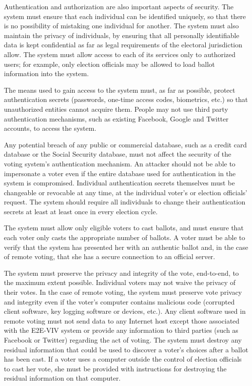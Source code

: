 Authentication and authorization are also important aspects of
security. The system must ensure that each individual can be
identified uniquely, so that there is no possibility of mistaking one
individual for another. The system must also maintain the privacy of
individuals, by ensuring that all personally identifiable data is kept
confidential as far as legal requirements of the electoral
jurisdiction allow. The system must allow access to each of its
services only to authorized users; for example, only election
officials may be allowed to load ballot information into the system.

The means used to gain access to the system must, as far as possible,
protect authentication secrets (passwords, one-time access codes,
biometrics, etc.) so that unauthorized entities cannot acquire
them. People may not use third party authentication mechanisms, such
as existing Facebook, Google and Twitter accounts, to access the
system. 

Any potential breach of any public or commercial database, such as a
credit card database or the Social Security database, must not affect
the security of the voting system's authentication mechanism. An
attacker should not be able to impersonate a voter even if the entire
database used for authentication in the system is
compromised. Individual authentication secrets themselves must be
changeable or revocable at any time, at the individual voter's or
election officials' request. The system should require all individuals
to change their authentication secrets at least at least once in every
election cycle.

The system must allow only eligible voters to cast ballots, and must
ensure that each voter only casts the appropriate number of ballots. A
voter must be able to verify that the system has presented her with an
authentic ballot and, in the case of remote voting, that she has a
secure connection to an official server.

The system must preserve the privacy and integrity of the vote,
end-to-end, to the maximum extent possible. Individual voters may not
waive the privacy of their votes. In the case of remote voting, the
system must preserve vote privacy and integrity even if the voter's
computer contains malicious code (corrupted client software, key
logging software or devices, etc.). Any client software used in remote
voting must not send data to any Internet host except those associated
with the E2E-VIV system or provide any information to third parties
(such as Facebook or Twitter) regarding the act of voting. The system
must destroy any residual information that could be used to discover a
voter's choices after a ballot has been cast. If a voter uses a
computer outside the control of election officials to cast her vote,
she must be provided with instructions for destroying the residual
information on that computer.

